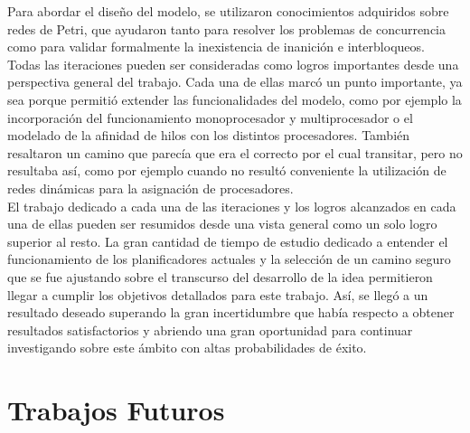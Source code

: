 \documentclass[a4paper]{book}
\begin{document}
Para abordar el diseño del modelo, se utilizaron conocimientos adquiridos sobre redes de Petri, que ayudaron tanto para resolver los problemas de concurrencia como para validar formalmente la inexistencia de inanición e interbloqueos.\\

Todas las iteraciones pueden ser consideradas como logros importantes desde una perspectiva general del trabajo. Cada una de ellas marcó un punto importante, ya sea porque permitió extender las funcionalidades del modelo, como por ejemplo la incorporación del funcionamiento monoprocesador y multiprocesador o el modelado de la afinidad de hilos con los distintos procesadores. Tambi\'en resaltaron un camino que parecía que era el correcto por el cual transitar, pero no resultaba así, como por ejemplo cuando no resultó conveniente la utilización de redes dinámicas para la asignación de procesadores.\\

El trabajo dedicado a cada una de las iteraciones y los logros alcanzados en cada una de ellas pueden ser resumidos desde una vista general como un solo logro superior al resto. La gran cantidad de tiempo de estudio dedicado a entender el funcionamiento de los planificadores actuales y la selección de un camino seguro que se fue ajustando sobre el transcurso del desarrollo de la idea permitieron llegar a cumplir los objetivos detallados para este trabajo. Así, se llegó a un resultado deseado superando la gran incertidumbre que había respecto a obtener resultados satisfactorios y abriendo una gran oportunidad para continuar investigando sobre este ámbito con altas probabilidades de éxito.

\section{Trabajos Futuros}
\end{document}
